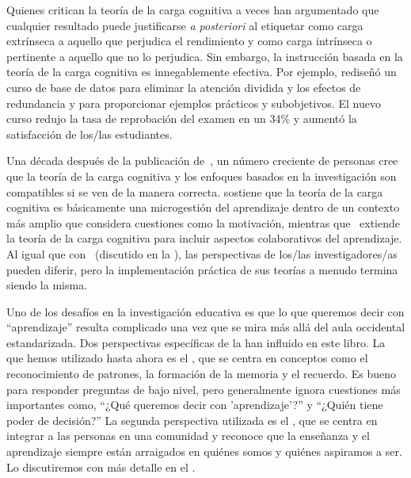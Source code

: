 
Quienes critican la teoría de la carga cognitiva a veces han argumentado que
cualquier resultado puede justificarse \emph{a posteriori} al etiquetar como carga extrínseca a
aquello que perjudica el rendimiento 
y como carga intrínseca o pertinente a aquello que no lo perjudica.
Sin embargo,
la instrucción basada en la teoría de la carga cognitiva es innegablemente efectiva.
Por ejemplo,
\cite{Maso2016} rediseñó un curso de base de datos para eliminar la atención dividida y los efectos de redundancia
y para proporcionar ejemplos prácticos y subobjetivos.
El nuevo curso redujo la tasa de reprobación del examen en un 34\%
y aumentó la satisfacción de los/las estudiantes.

Una década después de la publicación de~\cite{Kirs2006},
un número creciente de personas cree que la teoría de la carga cognitiva y los enfoques basados en la investigación son compatibles
si se ven de la manera correcta.
\cite{Kaly2015} sostiene que la teoría de la carga cognitiva es básicamente una microgestión del aprendizaje
dentro de un contexto más amplio que considera cuestiones como la motivación,
mientras que~\cite{Kirs2018} extiende la teoría de la carga cognitiva para incluir aspectos colaborativos del aprendizaje.
Al igual que con~\cite{Mark2018} (discutido en la ),
las perspectivas de los/las investigadores/as pueden diferir,
pero la implementación práctica de sus teorías a menudo termina siendo la misma.

Uno de los desafíos en la investigación educativa es que
lo que queremos decir con ``aprendizaje'' resulta complicado
una vez que se mira más allá del aula occidental estandarizada.
Dos perspectivas específicas de la  han influido en este libro.
La que hemos utilizado hasta ahora es el ,
que se centra en conceptos como el reconocimiento de patrones, la formación de la memoria y el recuerdo.
Es bueno para responder preguntas de bajo nivel,
pero generalmente ignora cuestiones más importantes como,
``¿Qué queremos decir con 'aprendizaje'?'' y
``¿Quién tiene poder de decisión?''
La segunda perspectiva utilizada es el ,
que se centra en integrar a las personas en una comunidad
y reconoce que
la enseñanza y el aprendizaje siempre están arraigados en quiénes somos y quiénes aspiramos a ser.
Lo discutiremos con más detalle en el .


